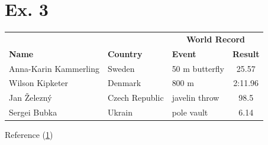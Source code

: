 \documentclass{article}
\begin{document}
\section{Ex. 3}
\begin{table}[h]
\begin{center}
\begin{tabular}{l l l c}
\hline
& & \multicolumn{2}{c}{\textbf{World Record}}\\
\cline{3-4}
\textbf{Name} &\textbf{Country} &\textbf{Event} &\textbf{Result}\\
\hline
Anna-Karin  Kammerling & Sweden & 50 m butterfly & 25.57\\
Wilson Kipketer & Denmark & 800 m & 2:11.96\\
Jan \v{Z}elezn\'{y} & Czech Republic & javelin throw & 98.5\\
Sergei Bubka & Ukrain & pole vault & 6.14\\
\hline
\end{tabular}
\end{center}
\label{Asd}
\end{table}
Reference (\ref{Asd})
\end{document}
